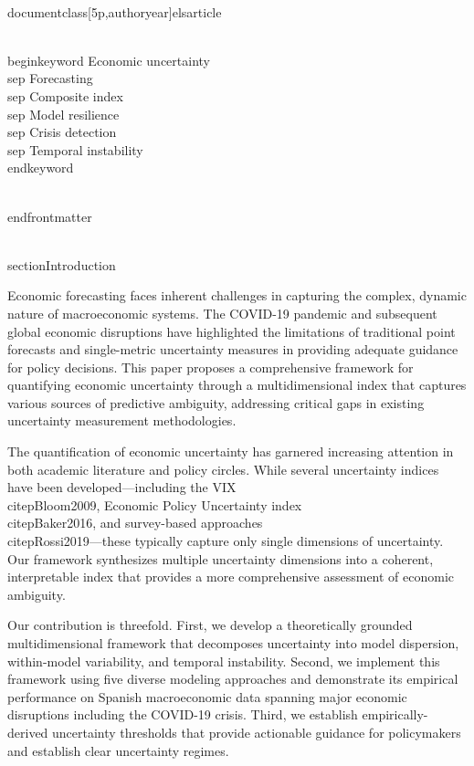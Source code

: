 \\documentclass[5p,authoryear]{elsarticle}
\begin{document}
\\begin{keyword}
Economic uncertainty \\sep Forecasting \\sep Composite index \\sep Model resilience \\sep Crisis detection \\sep Temporal instability
\\end{keyword}

\\end{frontmatter}

\\section{Introduction}

Economic forecasting faces inherent challenges in capturing the complex, dynamic nature of macroeconomic systems. The COVID-19 pandemic and subsequent global economic disruptions have highlighted the limitations of traditional point forecasts and single-metric uncertainty measures in providing adequate guidance for policy decisions. This paper proposes a comprehensive framework for quantifying economic uncertainty through a multidimensional index that captures various sources of predictive ambiguity, addressing critical gaps in existing uncertainty measurement methodologies.

The quantification of economic uncertainty has garnered increasing attention in both academic literature and policy circles. While several uncertainty indices have been developed—including the VIX \\citep{Bloom2009}, Economic Policy Uncertainty index \\citep{Baker2016}, and survey-based approaches \\citep{Rossi2019}—these typically capture only single dimensions of uncertainty. Our framework synthesizes multiple uncertainty dimensions into a coherent, interpretable index that provides a more comprehensive assessment of economic ambiguity.

Our contribution is threefold. First, we develop a theoretically grounded multidimensional framework that decomposes uncertainty into model dispersion, within-model variability, and temporal instability. Second, we implement this framework using five diverse modeling approaches and demonstrate its empirical performance on Spanish macroeconomic data spanning major economic disruptions including the COVID-19 crisis. Third, we establish empirically-derived uncertainty thresholds that provide actionable guidance for policymakers and establish clear uncertainty regimes.
\end{document}
